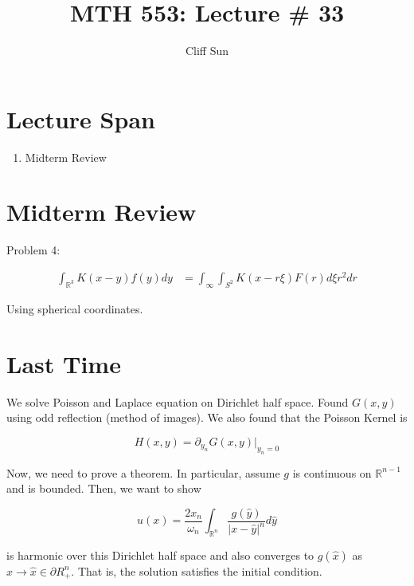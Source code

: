 \documentclass{article}
\title{MTH 553: Lecture \# 33}
\author{Cliff Sun}
\newtheorem{one minute paper}[theorem]{One Minute Paper}
\begin{document}
\maketitle

\section*{Lecture Span}
\begin{enumerate}
    \item Midterm Review
\end{enumerate}

\section*{Midterm Review}

Problem 4: 

\begin{align*}
    \int_{\mathbb{R}^3}K(x-y)f(y)dy &= \int_{\infty}\int_{S^2}K(x - r\xi)F(r)d\xi r^2 dr
\end{align*}

Using spherical coordinates.

\section*{Last Time}

We solve Poisson and Laplace equation on Dirichlet half space. Found $G(x,y)$ using odd reflection (method of images). We also found that the Poisson Kernel is 

\begin{equation}
    H(x,y) = \partial_{y_n}G(x,y)\bigg|_{y_n = 0}
\end{equation}

Now, we need to prove a theorem. In particular, assume $g$ is continuous on $\mathbb{R}^{n-1}$ and is bounded. Then, we want to show 

\begin{equation}
    u(x) = \frac{2x_n}{\omega_n}\int_{\mathbb{R}^n}\frac{g(\hat{y})}{|x - \hat{y}|^n}d\hat{y}
\end{equation}

is harmonic over this Dirichlet half space and also converges to $g(\hat{x})$ as $x \rightarrow \hat{x} \in \partial R_{+}^{n}$. That is, the solution satisfies the initial condition. 
\end{document}
